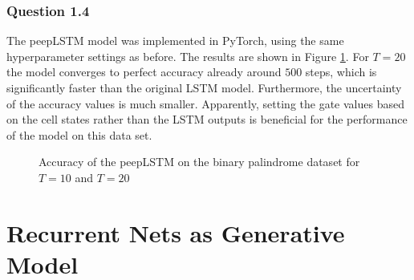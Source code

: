 \documentclass{article}
\begin{document}
\subsubsection*{Question 1.4}
The peepLSTM model was implemented in PyTorch, using the same hyperparameter settings as before. The results are shown in Figure \ref{fig:peeplstm}. For $T = 20$ the model converges to perfect accuracy already around $500$ steps, which is significantly faster than the original LSTM model. Furthermore, the uncertainty of the accuracy values is much smaller. Apparently, setting the gate values based on the cell states rather than the LSTM outputs is beneficial for the performance of the model on this data set.
\begin{figure}[h]
	\centering
	\caption{Accuracy of the peepLSTM on the binary palindrome dataset for $T=10$ and $T = 20$}
	\label{fig:peeplstm}
\end{figure}
\section{Recurrent Nets as Generative Model}
\end{document}
